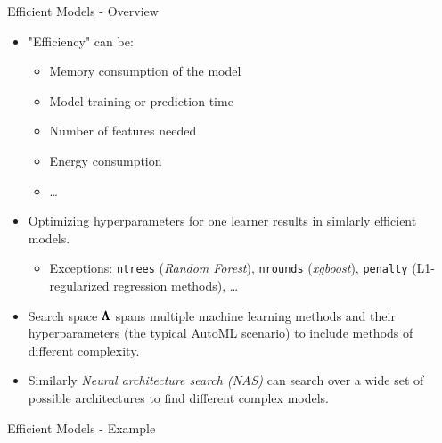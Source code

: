 \begin{frame}{Efficient Models - Overview}

\begin{itemize}
  \item "Efficiency" can be:
  \begin{itemize}
    \item Memory consumption of the model
    \item Model training or prediction time
    \item Number of features needed
    \item Energy consumption
    \item \ldots
  \end{itemize}
  \item Optimizing hyperparameters for one learner results in simlarly efficient models.
  \begin{itemize}
    \item Exceptions: \texttt{ntrees} (\emph{Random Forest}), \texttt{nrounds} (\emph{xgboost}), \texttt{penalty} (L1-regularized regression methods), \ldots
  \end{itemize}
  \item Search space $\pmb{\Lambda}$ spans multiple machine learning methods and their hyperparameters (the typical AutoML scenario) to include methods of different complexity.
  \item Similarly \emph{Neural architecture search (NAS)} can search over a wide set of possible architectures to find different complex models.
\end{itemize}

\end{frame}

\begin{frame}{Efficient Models - Example}
    
\end{frame}

